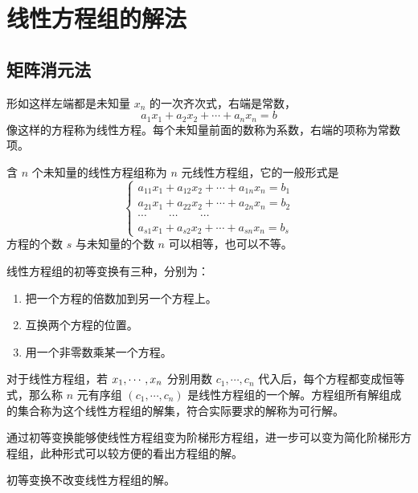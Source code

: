 
\chapter{线性方程组的解法}

\section{矩阵消元法}

形如这样左端都是未知量 $x_n$ 的一次齐次式，右端是常数，
\[a_1x_1+a_2x_2+\cdots+a_nx_n=b\]
像这样的方程称为线性方程。每个未知量前面的数称为系数，右端的项称为常数项。

含 $n$ 个未知量的线性方程组称为 $n$ 元线性方程组，它的一般形式是
\begin{equation*}
	\left\{
	\begin{matrix}
		a_{11}x_1+a_{12}x_2+\cdots+a_{1n}x_n=b_1 \\
		a_{21}x_1+a_{22}x_2+\cdots+a_{2n}x_n=b_2 \\
		\cdots\qquad\cdots\qquad\cdots           \\
		a_{s1}x_1+a_{s2}x_2+\cdots+a_{sn}x_n=b_s
	\end{matrix}
	\right.
\end{equation*}
方程的个数 $s$ 与未知量的个数 $n$ 可以相等，也可以不等。

\begin{definition}[线性方程组的初等变换]
	线性方程组的初等变换有三种，分别为：

	\begin{enumerate}
		\item 把一个方程的倍数加到另一个方程上。
		\item 互换两个方程的位置。
		\item 用一个非零数乘某一个方程。
	\end{enumerate}
\end{definition}

对于线性方程组，若 $x_1,\cdots,x_n$ 分别用数 $c_1,\cdots,c_n$ 代入后，每个方程都变成恒等式，那么称 $n$ 元有序组 $(c_1,\cdots,c_n)$ 是线性方程组的一个解。方程组所有解组成的集合称为这个线性方程组的解集，符合实际要求的解称为可行解。

通过初等变换能够使线性方程组变为阶梯形方程组，进一步可以变为简化阶梯形方程组，此种形式可以较方便的看出方程组的解。

\begin{theorem}
	初等变换不改变线性方程组的解。
\end{theorem}

